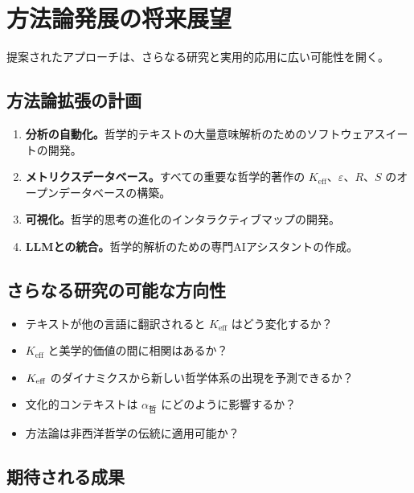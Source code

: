 \documentclass[11pt,a4paper]{article}
\newcommand{\eps}{\varepsilon}
\begin{document}
	\section{方法論発展の将来展望}
	\label{sec:future-directions}
	
	提案されたアプローチは、さらなる研究と実用的応用に広い可能性を開く。
	
	\subsection{方法論拡張の計画}
	
	\begin{enumerate}
		\item \textbf{分析の自動化。}哲学的テキストの大量意味解析のためのソフトウェアスイートの開発。
		\item \textbf{メトリクスデータベース。}すべての重要な哲学的著作の \(K_{\mathrm{eff}}\)、\(\eps\)、\(R\)、\(S\) のオープンデータベースの構築。
		\item \textbf{可視化。}哲学的思考の進化のインタラクティブマップの開発。
		\item \textbf{LLMとの統合。}哲学的解析のための専門AIアシスタントの作成。
	\end{enumerate}
	
	\subsection{さらなる研究の可能な方向性}
	
	\begin{itemize}
		\item テキストが他の言語に翻訳されると \(K_{\mathrm{eff}}\) はどう変化するか？
		\item \(K_{\mathrm{eff}}\) と美学的価値の間に相関はあるか？
		\item \(\Keff\) のダイナミクスから新しい哲学体系の出現を予測できるか？
		\item 文化的コンテキストは \(\alpha_{\text{哲}}\) にどのように影響するか？
		\item 方法論は非西洋哲学の伝統に適用可能か？
	\end{itemize}
	
	\subsection{期待される成果}
	
\end{document}
